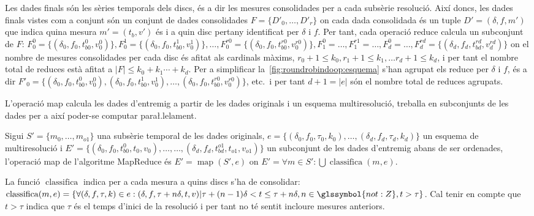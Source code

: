 Les dades finals són les sèries temporals dels discs, és a dir les
mesures consolidades per a cada subsèrie resolució. Així doncs, les
dades finals vistes com a conjunt són un conjunt de dades consolidades
$F=\{ D'_{0}, \dotsc, D'_r\}$ on cada dada consolidada és un tuple
$D'=(\delta,f,m')$ que indica quina mesura $m'=(t_b,v')$ és i a quin
disc pertany identificat per $\delta$ i $f$.  Per tant, cada operació
reduce calcula un subconjunt de $F$: $F_0^0
=\{(\delta_0,f_0,t_{b0}^0,v_0^0)\}, F_0^1
=\{(\delta_0,f_0,t_{b0}^1,v_0^1)\}, \dotsc, F_0^{r0}
=\{(\delta_0,f_0,t_{b0}^{r0},v_0^{r0})\}, F_1^0= \dotsc, F_1^{r1}=
\dotsc, F_d^0= \dotsc, F_d^{rd}=
\{(\delta_d,f_d,t_{bd}^{rd},v_d^{rd})\}$ on el nombre de mesures
consolidades per cada disc és afitat als cardinals màxims, $r_0 +1
\leq k_0, r_1 +1 \leq k_1, \dotsc r_d +1 \leq k_d$, i per tant el
nombre total de reduces està afitat a $|F| \leq k_0+k_1\dotsb+k_d$.
Per a simplificar la~\autoref{fig:roundrobindoop:esquema} s'han
agrupat els reduce per $\delta$ i $f$, és a dir $F'_0 =
\{(\delta_0,f_0,t_{b0}^0,v_0^0),(\delta_0,f_0,t_{b0}^1,v_0^1),\dotsc,
(\delta_0,f_0,t_{b0}^{r0},v_0^{r0})\}$, etc.\ i per tant $d+1= |e|$
són el nombre total de reduces agrupats.



L'operació map calcula les dades d'entremig a partir de les dades
originals i un esquema multiresolució, treballa en subconjunts de les
dades per a així poder-se computar para\l.lelament.
\begin{definition}
  Sigui $S'=\{m_0,\dotsc,m_{o1}\}$ una subsèrie temporal de les dades
  originals, $e=\{ (\delta_0,f_0,\tau_0,k_0),\ldots,
  (\delta_d,f_d,\tau_d,k_d)\}$ un esquema de multiresolució i
  $E'=\{(\delta_0,f_0, t_{b0}^0, t_0,v_0),\dotsc, \dotsc,
  (\delta_d,f_d, t_{bd}^{o1}, t_{o1},v_{o1}) \}$ un subconjunt de les
  dades d'entremig abans de ser ordenades, l'operació map de
  l'algoritme MapReduce és $E'=\operatorname{map}(S',e)$ on $E'=
  \forall m \in S': \bigcup\operatorname{classifica}(m,e)$.

  La funció $\operatorname{classifica}$ indica per a cada mesura a quins
  discs s'ha de consolidar: $\operatorname{classifica}(m,e)=\{ \forall
  (\delta,f,\tau,k) \in e: (\delta,f,\tau+n\delta,t,v) |
  \tau+(n-1)\delta < t \leq \tau+n\delta, n\in\glssymbol{not:Z}, t >
  \tau \}$. Cal tenir en compte que $t > \tau$ indica que $\tau$ és el temps
  d'inici de la resolució i per tant no té sentit incloure mesures
  anteriors.
\end{definition}






